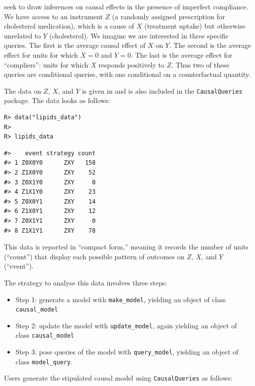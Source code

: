 \documentclass[
  11pt,
  article]{jss}
\providecommand{\tightlist}{%
  \setlength{\itemsep}{0pt}\setlength{\parskip}{0pt}}\usepackage{longtable,booktabs,array}
\begin{document}
\citet{chickering_clinicians_1996} seek to draw inferences on causal
effects in the presence of imperfect compliance. We have access to an
instrument \(Z\) (a randomly assigned prescription for cholesterol
medication), which is a cause of \(X\) (treatment uptake) but otherwise
unrelated to \(Y\) (cholesterol). We imagine we are interested in three
specific queries. The first is the average causal effect of \(X\) on
\(Y\). The second is the average effect for units for which \(X=0\) and
\(Y=0\). The last is the average effect for ``compliers'': units for
which \(X\) responds positively to \(Z\). Thus two of these queries are
conditional queries, with one conditional on a counterfactual quantity.

The data on \(Z\), \(X\), and \(Y\) is given in
\citet{chickering_clinicians_1996} and is also included in the
\texttt{CausalQueries} package. The data looks as follows:

\begin{verbatim}
R> data("lipids_data")
R> 
R> lipids_data
\end{verbatim}

\begin{verbatim}
#>    event strategy count
#> 1 Z0X0Y0      ZXY   158
#> 2 Z1X0Y0      ZXY    52
#> 3 Z0X1Y0      ZXY     0
#> 4 Z1X1Y0      ZXY    23
#> 5 Z0X0Y1      ZXY    14
#> 6 Z1X0Y1      ZXY    12
#> 7 Z0X1Y1      ZXY     0
#> 8 Z1X1Y1      ZXY    78
\end{verbatim}

This data is reported in ``compact form,'' meaning it records the number
of units (``count'') that display each possible pattern of outcomes on
\(Z\), \(X\), and \(Y\) (``event'').

The strategy to analyse this data involves three steps:

\begin{itemize}
\tightlist
\item
  Step 1: generate a model with \texttt{make\_model}, yielding an object
  of class \texttt{causal\_model}
\item
  Step 2: update the model with \texttt{update\_model}, again yielding
  an object of class \texttt{causal\_model}
\item
  Step 3: pose queries of the model with \texttt{query\_model}, yielding
  an object of class \texttt{model\_query}.
\end{itemize}

Users generate the stipulated causal model using \texttt{CausalQueries}
as follows:
\end{document}
